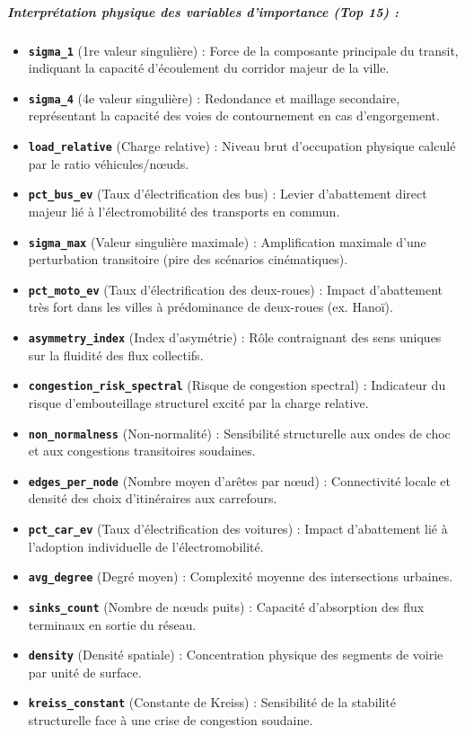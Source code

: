\documentclass[10pt, a4paper]{article}
\providecommand{\tightlist}{}
\begin{document}
\subparagraph{Interprétation physique des variables d'importance (Top
15)
:}\label{interpruxe9tation-physique-des-variables-dimportance-top-15}

\begin{itemize}
\tightlist
\item
  \textbf{\texttt{sigma\_1}} (1re valeur singulière) : Force de la
  composante principale du transit, indiquant la capacité d'écoulement
  du corridor majeur de la ville.
\item
  \textbf{\texttt{sigma\_4}} (4e valeur singulière) : Redondance et
  maillage secondaire, représentant la capacité des voies de
  contournement en cas d'engorgement.
\item
  \textbf{\texttt{load\_relative}} (Charge relative) : Niveau brut
  d'occupation physique calculé par le ratio véhicules/nœuds.
\item
  \textbf{\texttt{pct\_bus\_ev}} (Taux d'électrification des bus) :
  Levier d'abattement direct majeur lié à l'électromobilité des
  transports en commun.
\item
  \textbf{\texttt{sigma\_max}} (Valeur singulière maximale) :
  Amplification maximale d'une perturbation transitoire (pire des
  scénarios cinématiques).
\item
  \textbf{\texttt{pct\_moto\_ev}} (Taux d'électrification des
  deux-roues) : Impact d'abattement très fort dans les villes à
  prédominance de deux-roues (ex. Hanoï).
\item
  \textbf{\texttt{asymmetry\_index}} (Index d'asymétrie) : Rôle
  contraignant des sens uniques sur la fluidité des flux collectifs.
\item
  \textbf{\texttt{congestion\_risk\_spectral}} (Risque de congestion
  spectral) : Indicateur du risque d'embouteillage structurel excité par
  la charge relative.
\item
  \textbf{\texttt{non\_normalness}} (Non-normalité) : Sensibilité
  structurelle aux ondes de choc et aux congestions transitoires
  soudaines.
\item
  \textbf{\texttt{edges\_per\_node}} (Nombre moyen d'arêtes par nœud) :
  Connectivité locale et densité des choix d'itinéraires aux carrefours.
\item
  \textbf{\texttt{pct\_car\_ev}} (Taux d'électrification des voitures) :
  Impact d'abattement lié à l'adoption individuelle de
  l'électromobilité.
\item
  \textbf{\texttt{avg\_degree}} (Degré moyen) : Complexité moyenne des
  intersections urbaines.
\item
  \textbf{\texttt{sinks\_count}} (Nombre de nœuds puits) : Capacité
  d'absorption des flux terminaux en sortie du réseau.
\item
  \textbf{\texttt{density}} (Densité spatiale) : Concentration physique
  des segments de voirie par unité de surface.
\item
  \textbf{\texttt{kreiss\_constant}} (Constante de Kreiss) : Sensibilité
  de la stabilité structurelle face à une crise de congestion soudaine.
\end{itemize}
\end{document}
